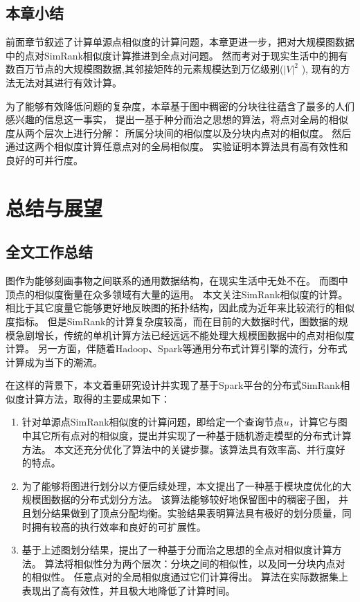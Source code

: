 \documentclass[master]{njuthesis}
\begin{document}
\section{本章小结}
前面章节叙述了计算单源点相似度的计算问题，本章更进一步，把对大规模图数据中的点对SimRank相似度计算推进到全点对问题。
然而考对于现实生活中的拥有数百万节点的大规模图数据,其邻接矩阵的元素规模达到万亿级别($|V|^2$ ),
现有的方法无法对其进行有效计算。

为了能够有效降低问题的复杂度，本章基于图中稠密的分块往往蕴含了最多的人们感兴趣的信息这一事实，
提出一基于种分而治之思想的算法，将点对全局的相似度从两个层次上进行分解：
所属分块间的相似度以及分块内点对的相似度。
然后通过这两个相似度计算任意点对的全局相似度。
实验证明本算法具有高有效性和良好的可并行度。
\chapter{总结与展望}\label{chapter_concludes}
\section{全文工作总结}
图作为能够刻画事物之间联系的通用数据结构，在现实生活中无处不在。
而图中顶点的相似度衡量在众多领域有大量的运用。
本文关注SimRank相似度的计算。
相比于其它度量它能够更好地反映图的拓扑结构，因此成为近年来比较流行的相似度指标。
但是SimRank的计算复杂度较高，而在目前的大数据时代，图数据的规模急剧增长，传统的单机计算方法已经远远不能处理大规模图数据中的点对相似度计算。
另一方面，伴随着Hadoop、Spark等通用分布式计算引擎的流行，分布式计算成为当下的潮流。

在这样的背景下，本文着重研究设计并实现了基于Spark平台的分布式SimRank相似度计算方法，取得的主要成果如下：
\begin{enumerate}
 \item 针对单源点SimRank相似度的计算问题，即给定一个查询节点$u$，计算它与图中其它所有点对的相似度，提出并实现了一种基于随机游走模型的分布式计算方法。
 本文还充分优化了算法中的关键步骤。该算法具有效率高、并行度好的特点。
 \item 为了能够将图进行划分以方便后续处理，本文提出了一种基于模块度优化的大规模图数据的分布式划分方法。 该算法能够较好地保留图中的稠密子图，
 并且划分结果做到了顶点分配均衡。实验结果表明算法具有极好的划分质量，同时拥有较高的执行效率和良好的可扩展性。
 \item 基于上述图划分结果，提出了一种基于分而治之思想的全点对相似度计算方法。 算法将相似性分为两个层次：分块之间的相似性，以及同一分块内点对的相似性。
 任意点对的全局相似度通过它们计算得出。 算法在实际数据集上表现出了高有效性，并且极大地降低了计算时间。
\end{enumerate}
\end{document}
